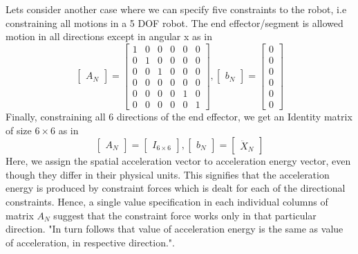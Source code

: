 \par Lets consider another case where we can specify five constraints to the robot, i.e constraining all motions in a 5 DOF robot. The end effector/segment is allowed motion in all directions except in angular x as in \cite{shakhimardanov2015}
\[
\begin{bmatrix}
A_{N} 
\end{bmatrix}
=
\begin{bmatrix}
1 & 0 & 0 & 0 & 0 & 0\\ 0 & 1 & 0 & 0 & 0 & 0 \\ 0 & 0 & 1 & 0 & 0 & 0 \\ 0 & 0 & 0 & 0 & 0 & 0 \\0 & 0 & 0 & 0 & 1 & 0 \\ 0 & 0 & 0 & 0 & 0 & 1
\end{bmatrix},
\begin{bmatrix}
b_{N}
\end{bmatrix}
=
\begin{bmatrix}
0 \\ 0 \\ 0 \\0 \\0 \\0
\end{bmatrix}
\]
Finally, constraining all 6 directions of the end effector, we get an Identity matrix of size $6 \times 6$ as in \cite{shakhimardanov2015}
\[
\begin{bmatrix}
A_{N} 
\end{bmatrix}
=
\begin{bmatrix}
I_{6\times 6}
\end{bmatrix},
\begin{bmatrix}
b_{N}
\end{bmatrix}
=
\begin{bmatrix}
\ddot{X}_{N}
\end{bmatrix}
\]
Here, we assign the spatial acceleration vector to acceleration energy vector, even though they differ in their physical units. This signifies that the acceleration energy is produced by constraint forces which is dealt for each of the directional constraints. Hence, a single value specification in each individual columns of matrix $A_{N}$ suggest that the constraint force works only in that particular direction. "In turn follows that value of acceleration energy is the same as value of acceleration, in respective direction."\cite{Vuckevic}.